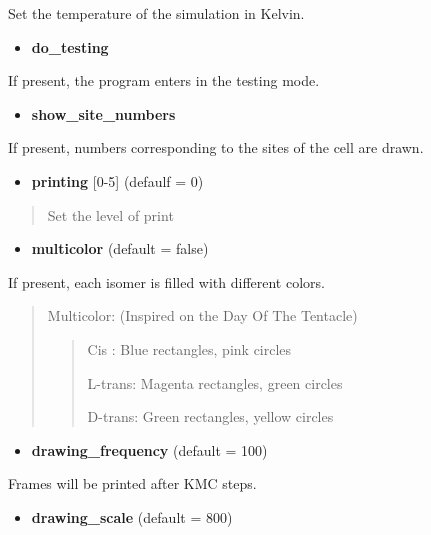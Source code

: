 \documentclass[letterpaper,10pt,english]{sphinxmanual}
\begin{document}
Set the temperature of the simulation in Kelvin.
\begin{itemize}
\item {} 
\textbf{do\_testing}

\end{itemize}

If present, the program enters in the testing mode.
\begin{itemize}
\item {} 
\textbf{show\_site\_numbers}

\end{itemize}

If present, numbers corresponding to the sites of the cell are drawn.
\begin{itemize}
\item {} 
\textbf{printing}  {[}0-5{]} (defaulf = 0)

\end{itemize}
\begin{quote}

Set the level of print
\end{quote}
\begin{itemize}
\item {} 
\textbf{multicolor}  (default = false)

\end{itemize}

If present, each isomer is filled with different colors.
\begin{quote}

Multicolor: (Inspired on the Day Of The Tentacle)
\begin{quote}

Cis : Blue rectangles, pink circles

L-trans: Magenta rectangles, green circles

D-trans: Green rectangles, yellow circles
\end{quote}
\end{quote}
\begin{itemize}
\item {} 
\textbf{drawing\_frequency}   (default = 100)

\end{itemize}

Frames will be printed after  KMC steps.
\begin{itemize}
\item {} 
\textbf{drawing\_scale}   (default = 800)

\end{itemize}
\end{document}
